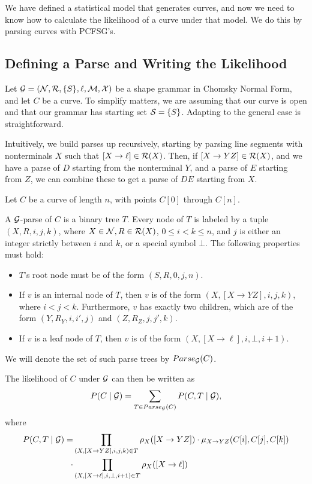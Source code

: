 

We have defined a statistical model that generates curves, and now we
need to know how to calculate the likelihood of a curve under that
model. We do this by parsing curves with PCFSG's.

\subsection{Defining a Parse and Writing the Likelihood}

Let ${\mathcal G} = ({\mathcal N}, {\mathcal R}, \{S\}, \ell, {\mathcal M}, {\mathcal X})$ be a shape grammar in
Chomsky Normal Form, and let $C$ be a curve. To simplify matters, we
are assuming that our curve is open and that our grammar has starting
set ${\mathcal S} = \{S\}$. Adapting to the general case is straightforward.

Intuitively, we build parses up recursively, starting by parsing line
segments with nonterminals $X$ such that $[X\to \ell]\in
{\mathcal R}(X)$. Then, if $[X\to YZ]\in {\mathcal R}(X)$, and we have a parse of $D$
starting from the nonterminal $Y$, and a parse of $E$ starting from
$Z$, we can combine these to get a parse of $DE$ starting from $X$.

\begin{defn}
Let $C$ be a curve of length $n$, with points $C[0]$ through $C[n]$.

A ${\mathcal G}$-parse of $C$ is a binary tree $T$. Every node of $T$ is
labeled by a tuple $(X,R,i,j,k)$, where $X\in {\mathcal N}, R\in {\mathcal R}(X)$,
$0\le i < k \le n$, and $j$ is either an integer strictly between $i$
and $k$, or a special symbol $\bot$. The following properties must
hold: 
\begin{itemize}
\item $T$'s root node must be of the form $(S,R,0,j,n)$.
\item If $v$ is an internal node of $T$, then $v$ is of the form $(X,
  [X\to YZ], i, j, k)$, where $i < j < k$. Furthermore, $v$ has
  exactly two children, which are of the form $(Y,R_Y,i,i',j)$ and
  $(Z, R_Z, j, j', k)$.
\item If $v$ is a leaf node of $T$, then $v$ is of the form $(X, [X\to
  \ell], i, \bot, i+1)$.
\end{itemize}
We will denote the set of such parse trees by $Parse_{{\mathcal G}}(C)$. 
\end{defn}
The likelihood of $C$ under ${\mathcal G}$ can then be written as
$$P(C\mid {\mathcal G}) = \sum_{T\in Parse_{{\mathcal G}}(C)} P(C,T\mid {\mathcal G}),$$
where
\begin{align}
\label{joint-likelihood}
P(C,T\mid \GGG) = &\prod_{(X,[X\to YZ],i,j,k)\in T} \rho_X([X\to YZ])
\cdot \mu_{X\to YZ}(C[i], C[j], C[k]) \\
\nonumber
\cdot &\prod_{(X,[X\to \ell],i,\bot,i+1)\in T} \rho_X([X\to \ell])
\end{align}

